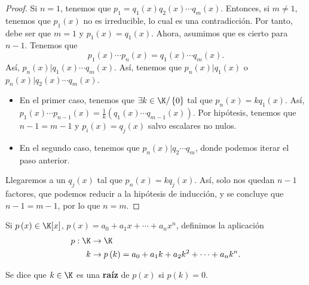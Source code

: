 \begin{proof}
Si $\displaystyle n = 1 $, tenemos que $\displaystyle p_{1} = q_{1}\left(x\right) q_{2}\left(x\right) \cdots q_{m}\left(x\right) $. Entonces, si $\displaystyle m \neq 1 $, tenemos que $\displaystyle p_{1}\left(x\right) $ no es irreducible, lo cual es una contradicción. Por tanto, debe ser que $\displaystyle m = 1 $ y $\displaystyle p_{1}\left(x\right) = q_{1}\left(x\right) $. Ahora, asumimos que es cierto para $\displaystyle n - 1 $. Tenemos que
\[p_{1}\left(x\right) \cdots p_{n}\left(x\right) = q_{1}\left(x\right) \cdots q_{m}\left(x\right) .\]
Así, $\displaystyle p_{n}\left(x\right) | q_{1}\left(x\right) \cdots q_{m}\left(x\right) $. Así, tenemos que $\displaystyle p_{n}\left(x\right) | q_{1}\left(x\right) $ o $\displaystyle p_{n}\left(x\right) | q_{2}\left(x\right) \cdots q_{m}\left(x\right) $. 
\begin{itemize}
	\item En el primer caso, tenemos que $\displaystyle \exists k \in \K/ \left\{ 0\right\}  $ tal que $\displaystyle p_{n}\left(x\right) = kq_{1}\left(x\right) $. Así, $\displaystyle p_{1}\left(x\right) \cdots p_{n-1}\left(x\right) = \frac{1}{k}\left(q_{1}\left(x\right) \cdots q_{m -1}\left(x\right)\right) $. Por hipótesis, tenemos que $\displaystyle n - 1 = m - 1 $ y $\displaystyle p_{i}\left(x\right) = q_{j}\left(x\right) $ salvo escalares no nulos.
	\item En el segundo caso, tenemos que $\displaystyle p_{n}\left(x\right) | q_{2} \cdots q_{m} $, donde podemos iterar el paso anterior.
\end{itemize}
Llegaremos a un $\displaystyle q_{j}\left(x\right) $ tal que $\displaystyle p_{n}\left(x\right) = kq_{j}\left(x\right) $. Así, solo nos quedan $\displaystyle n - 1 $ factores, que podemos reducir a la hipótesis de inducción, y se concluye que $\displaystyle n - 1 = m - 1 $, por lo que $\displaystyle n = m $. 
\end{proof}
Si $\displaystyle p\left(x\right) \in \K[x] $, $\displaystyle p\left(x\right) = a_{0} + a_{1}x + \cdots + a_{n}x^{n} $, definimos la aplicación 
\[
\begin{split}
	p : \K &\to \K \\
	k &\to p\left(k\right) = a_{0} + a_{1}k + a_{2}k^{2} + \cdots + a_{n}k^{n}.
\end{split}
\]
\begin{fdefinition}[]
\normalfont Se dice que $\displaystyle k \in \K $ es una \textbf{raíz} de $\displaystyle p\left(x\right) $ si $\displaystyle p\left(k\right) = 0 $.
\end{fdefinition}
